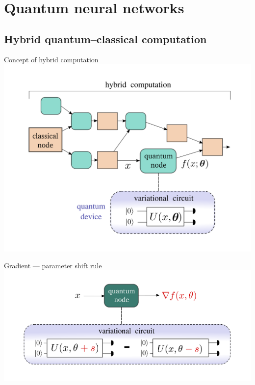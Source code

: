 \section{Quantum neural networks}
\subsection{Hybrid quantum--classical computation}
\begingroup
\nologo
\begin{frame}{Concept of hybrid computation}
	\centering
	\includegraphics[height=0.8\textheight]{pics/vqc/concepts.png}
\end{frame}
\endgroup
\begingroup
\nologo
\begin{frame}{Gradient --- parameter shift rule}
	\centering
	\includegraphics[height=0.75\textheight]{pics/vqc/grad.png}
\end{frame}
\endgroup
